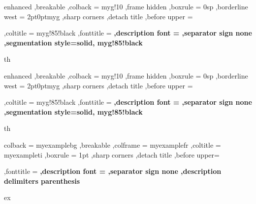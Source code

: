 {%
	enhanced
	,breakable
	,colback = myg!10
	,frame hidden
	,boxrule = 0sp
	,borderline west = {2pt}{0pt}{myg}
	,sharp corners
	,detach title
	,before upper = \tcbtitle\par\smallskip
	,coltitle = myg!85!black
	,fonttitle = \bfseries\sffamily
	,description font = \mdseries
	,separator sign none
	,segmentation style={solid, myg!85!black}
}
{th}
%
%
%
%
{%
	enhanced
	,breakable
	,colback = myg!10
	,frame hidden
	,boxrule = 0sp
	,borderline west = {2pt}{0pt}{myg}
	,sharp corners
	,detach title
	,before upper = \tcbtitle\par\smallskip
	,coltitle = myg!85!black
	,fonttitle = \bfseries\sffamily
	,description font = \mdseries
	,separator sign none
	,segmentation style={solid, myg!85!black}
}
{th}
%
%
%
%
{%
	colback = myexamplebg
	,breakable
	,colframe = myexamplefr
	,coltitle = myexampleti
	,boxrule = 1pt
	,sharp corners
	,detach title
	,before upper=\tcbtitle\par\smallskip
	,fonttitle = \bfseries
	,description font = \mdseries
	,separator sign none
	,description delimiters parenthesis
}
{ex}
%
